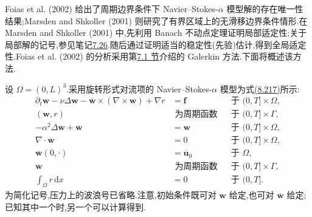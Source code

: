 \begin{note}
\label{note:navier-stokes-alpha-well-posedness}
Foias et al. (2002) 给出了周期边界条件下 Navier--Stokes-$\alpha$ 模型解的存在唯一性结果;Marsden and Shkoller (2001) 则研究了有界区域上的无滑移边界条件情形.在 Marsden and Shkoller (2001) 中,先利用 Banach 不动点定理证明局部适定性;关于局部解的记号,参见笔记\hyperref[note:time-dependent-local-existence-small-data]{7.26}.随后通过证明适当的稳定性(先验)估计,得到全局适定性.Foias et al. (2002) 的分析采用第\hyperref[sec:time-dependent-ns-continuous]{7.1 节}介绍的 Galerkin 方法.下面将概述该方法.
\end{note}

\begin{note}
\label{note:navier-stokes-alpha-periodic-domain}
设 $\Omega=(0,L)^3$.采用旋转形式对流项的 Navier--Stokes-$\alpha$ 模型为式\hyperref[eq:navier-stokes-alpha-rotational-form-alternative]{(8.217)}所示:
\begin{equation}\label{eq:navier-stokes-alpha-periodic-model}
\begin{aligned}
 \partial_t\bm{w}-\nu\Delta\bm{w}
  -\overline{\bm{w}}\times(\nabla\times\bm{w})+\nabla r
  &=\bm{f} &&\text{于 }(0,T]\times\Omega,\\
 (\bm{w},r)&\text{ 为周期函数}
  &&\text{于 }(0,T]\times\Gamma,\\
 -\alpha^2\Delta\overline{\bm{w}}+\overline{\bm{w}}
  &=\bm{w} &&\text{于 }(0,T]\times\Omega,\\
 \nabla\cdot\overline{\bm{w}}&=0
  &&\text{于 }(0,T]\times\Omega,\\
 \overline{\bm{w}}(0,\cdot)&=\overline{\bm{u}}_0
  &&\text{于 }\Omega,\\
 \overline{\bm{w}}&\text{ 为周期函数}
  &&\text{于 }(0,T]\times\Gamma,\\
 \int_\Omega r\,\mathrm{d}x&=0 &&\text{于 }(0,T].
\end{aligned}
\end{equation}
为简化记号,压力上的波浪号已省略.注意,初始条件既可对 $\bm{w}$ 给定,也可对 $\overline{\bm{w}}$ 给定;已知其中一个时,另一个可以计算得到.
\end{note}

